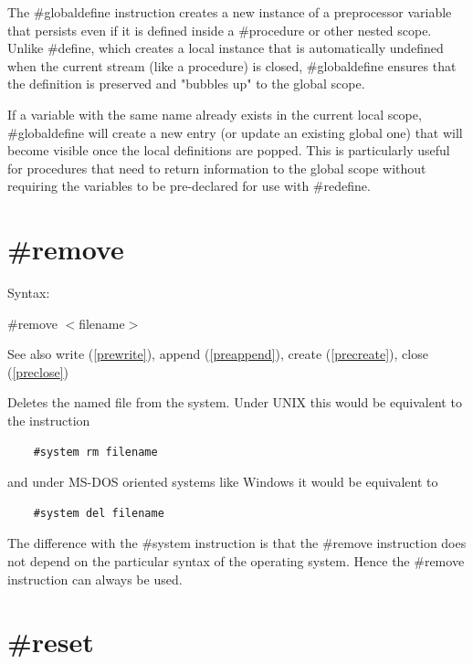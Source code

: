 \noindent The \#globaldefine instruction creates a new 
instance of a preprocessor 
variable that persists even if it is defined 
inside a \#procedure or other nested scope. Unlike \#define, which creates 
a local instance that is automatically undefined when the current stream 
(like a procedure) is closed, \#globaldefine ensures that the definition 
is preserved and "bubbles up" to the global scope.
 
If a variable with the same name already exists in the current local scope, 
\#globaldefine will create a new entry (or update an existing global one) 
that will become visible once the local definitions are popped. This is 
particularly useful for procedures that need to return information to the 
global scope without requiring the variables to be pre-declared for use 
with \#redefine.
 
 
\section{\#remove}
\label{preremove}

\noindent Syntax:

\#remove $<$filename$>$
 
\noindent See also write (\ref{prewrite}), append (\ref{preappend}),
            create (\ref{precreate}), close (\ref{preclose})

\noindent Deletes the named file from the system. Under 
UNIX this would be equivalent to the instruction
\begin{verbatim}
    #system rm filename
\end{verbatim}
and under MS-DOS oriented systems like Windows 
it would be equivalent to
\begin{verbatim}
    #system del filename
\end{verbatim}
The difference with the \#system instruction is that the 
\#remove instruction does not depend on the particular 
syntax of the operating system. Hence the \#remove instruction can always 
be used.

 
\section{\#reset}
\label{prereset}

